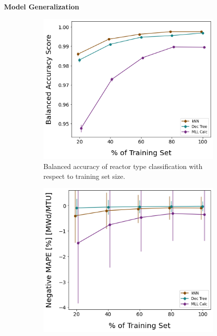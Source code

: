 \noindent \textbf{Model Generalization}

\begin{figure}[!htb]
    \centering
    \begin{subfigure}[b]{0.49\textwidth}
        \centering
        \includegraphics[width=\textwidth]{./chapters/exp1/learncurve_nuc29_BalAcc_rxtr.png}
        \caption{Balanced accuracy of reactor type classification with respect 
                 to training set size.}
        \label{fig:learnsA}
    \end{subfigure}
    \hfill
    \begin{subfigure}[b]{0.49\textwidth}
        \centering
        \includegraphics[width=\textwidth]{./chapters/exp1/learncurve_nuc29_MAPE_burn.png}

\end{subfigure}
\end{figure}
